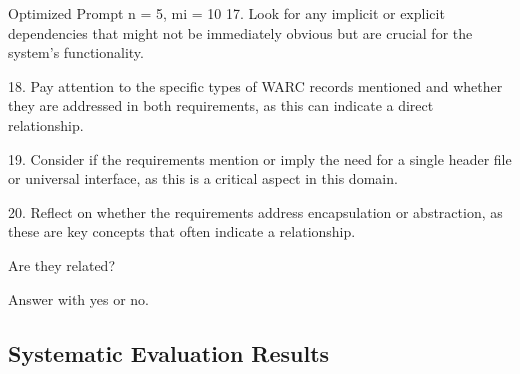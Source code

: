 \begin{prompt}{Optimized Prompt n = 5, mi = 10}
17. Look for any implicit or explicit dependencies that might not be immediately obvious but are crucial for the system's functionality.

18. Pay attention to the specific types of WARC records mentioned and whether they are addressed in both requirements, as this can indicate a direct relationship.

19. Consider if the requirements mention or imply the need for a single header file or universal interface, as this is a critical aspect in this domain.

20. Reflect on whether the requirements address encapsulation or abstraction, as these are key concepts that often indicate a relationship.

Are they related?

Answer with \textquotesingle{}yes\textquotesingle{} or \textquotesingle{}no\textquotesingle{}.
\end{prompt}
\subsection{Systematic Evaluation Results}

\begin{landscape}
\begin{table}
    \centering
    \renewcommand{\arraystretch}{1}
    
    \renewcommand{\arraystretch}{1}
    \caption{Naive prompt optimization approach considering previous misclassified \TLs}
    \label{tab:placeholder}
\end{table}
\end{landscape}